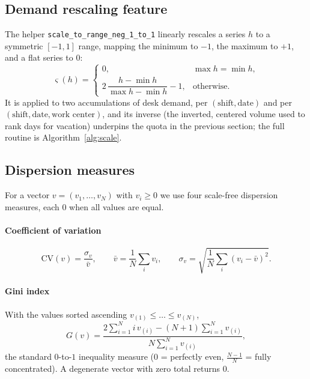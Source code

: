 \documentclass[preprint,12pt]{elsarticle}
\begin{document}
   \subsection{Demand rescaling feature}
   The helper \texttt{scale\_to\_range\_neg\_1\_to\_1} linearly rescales a series $h$ to a symmetric $[-1,1]$ range, mapping the minimum to $-1$, the maximum to $+1$, and a flat series to $0$:
   \begin{equation}
   \varsigma(h) =
   \begin{cases}
   0, & \max h = \min h,\\[2pt]
   2\,\dfrac{h - \min h}{\max h - \min h} - 1, & \text{otherwise}.
   \end{cases}
   \end{equation}
   It is applied to two accumulations of desk demand, per $(\text{shift},\text{date})$ and per $(\text{shift},\text{date},\text{work center})$, and its inverse (the inverted, centered volume used to rank days for vacation) underpins the quota in the previous section; the full routine is Algorithm~\ref{alg:scale}.

   \subsection{Dispersion measures}
   For a vector $v=(v_1,\dots,v_N)$ with $v_i \ge 0$ we use four scale-free dispersion measures, each $0$ when all values are equal.

   \paragraph{Coefficient of variation}
      \begin{equation}
      \mathrm{CV}(v) = \frac{\sigma_v}{\bar v}, \qquad
      \bar v = \frac1N\sum_i v_i, \qquad
      \sigma_v = \sqrt{\frac1N\sum_i (v_i-\bar v)^2}.
      \end{equation}

   \paragraph{Gini index} With the values sorted ascending $v_{(1)}\le\dots\le v_{(N)}$,
      \begin{equation}
      G(v) = \frac{2\sum\limits_{i=1}^{N} i\,v_{(i)} - (N+1)\sum\limits_{i=1}^{N} v_{(i)}}
                  {N \sum\limits_{i=1}^{N} v_{(i)}},
      \end{equation}
      the standard $0$-to-$1$ inequality measure ($0$ = perfectly even, $\tfrac{N-1}{N}$ = fully concentrated). A degenerate vector with zero total returns $0$.
\end{document}
